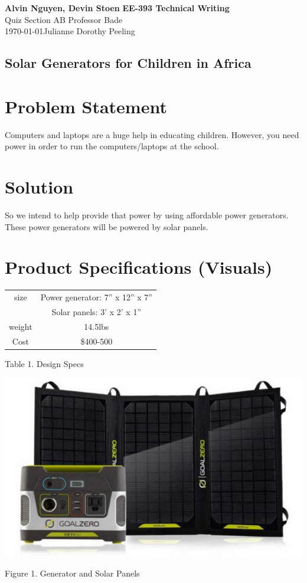 \documentclass[11pt]{article}
\begin{document}
\noindent
\large\textbf{Alvin Nguyen, Devin Stoen} \hfill \textbf{EE-393 Technical Writing} \\
\normalsize Quiz Section AB \hfill Professor Bade \\
\today \hfill Julianne Dorothy Peeling \\

\begin{center}
\section*{Solar Generators for Children in Africa}
\end{center}

\section*{Problem Statement}
Computers and laptops are a huge help in educating children. However, you need power in order to run the computers/laptops at the school.

\section*{Solution}
So we intend to help provide that power by using affordable power generators. These power generators will be powered by solar panels. 

\section*{Product Specifications (Visuals)}
\begin{center}
\begin{tabular}{|c|c|}
\hline
size & Power generator: 7” x 12” x 7”\\&Solar panels: 3’ x 2’ x 1”\\
\hline
weight & 14.5lbs\\
\hline
Cost & \$400-500\\
\hline
\end{tabular}

Table 1. Design Specs

\includegraphics[scale=0.5]{solar}

Figure 1. Generator and Solar Panels
\end{center}
\end{document}
